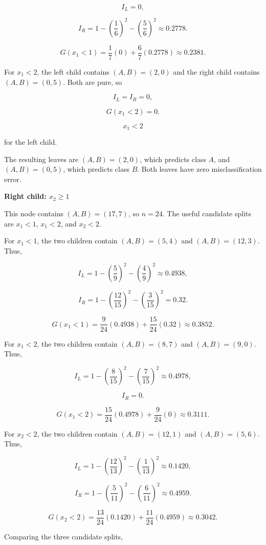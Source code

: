 \documentclass{article}
\begin{document}
$$
I_L=0,
$$

$$
I_R
=
1-\left(\frac{1}{6}\right)^2-\left(\frac{5}{6}\right)^2
\approx 0.2778.
$$

$$
G(x_1<1)
=
\frac{1}{7}(0)+\frac{6}{7}(0.2778)
\approx 0.2381.
$$

For $x_1<2$, the left child contains $(A,B)=(2,0)$ and the right child contains $(A,B)=(0,5)$. Both are pure, so

$$
I_L=I_R=0,
$$

$$
G(x_1<2)=0.
$$

$$
\boxed{x_1<2}
$$

for the left child.

The resulting leaves are $(A,B)=(2,0)$, which predicts class $A$, and $(A,B)=(0,5)$, which predicts class $B$. Both leaves have zero misclassification error.

\vspace{3mm}
\textbf{Right child: $x_2\geq 1$
}

This node contains $(A,B)=(17,7)$, so $n=24$. The useful candidate splits are $x_1<1$, $x_1<2$, and $x_2<2$.

For $x_1<1$, the two children contain $(A,B)=(5,4)$ and $(A,B)=(12,3)$. Thus,

$$
I_L
=
1-\left(\frac{5}{9}\right)^2-\left(\frac{4}{9}\right)^2
\approx 0.4938,
$$

$$
I_R
=
1-\left(\frac{12}{15}\right)^2-\left(\frac{3}{15}\right)^2
=
0.32.
$$


$$
G(x_1<1)
=
\frac{9}{24}(0.4938)
+
\frac{15}{24}(0.32)
\approx 0.3852.
$$

For $x_1<2$, the two children contain $(A,B)=(8,7)$ and $(A,B)=(9,0)$. Thus,

$$
I_L
=
1-\left(\frac{8}{15}\right)^2-\left(\frac{7}{15}\right)^2
\approx 0.4978,
$$

$$
I_R=0.
$$

$$
G(x_1<2)
=
\frac{15}{24}(0.4978)
+
\frac{9}{24}(0)
\approx 0.3111.
$$

For $x_2<2$, the two children contain $(A,B)=(12,1)$ and $(A,B)=(5,6)$. Thus,

$$
I_L
=
1-\left(\frac{12}{13}\right)^2-\left(\frac{1}{13}\right)^2
\approx 0.1420,
$$

$$
I_R
=
1-\left(\frac{5}{11}\right)^2-\left(\frac{6}{11}\right)^2
\approx 0.4959.
$$

$$
G(x_2<2)
=
\frac{13}{24}(0.1420)
+
\frac{11}{24}(0.4959)
\approx 0.3042.
$$

Comparing the three candidate splits,
\end{document}
